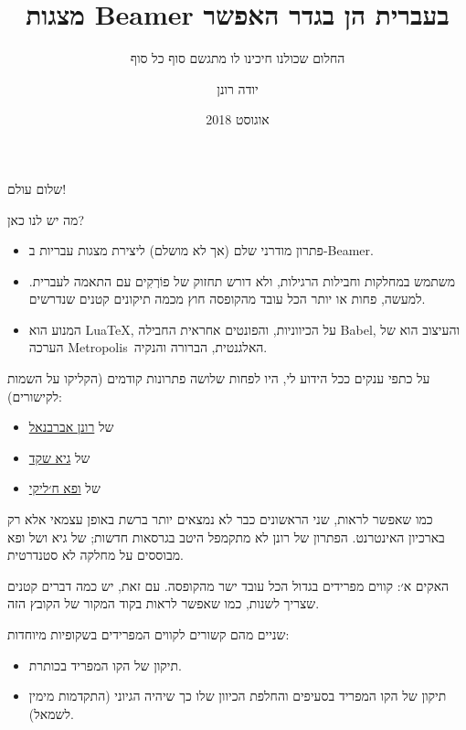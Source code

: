 \documentclass{beamer}
\author{
	\texorpdfstring{
		יודה רונן
		\quad \smallurl{<https://me.digitalwords.net/>}}{Yuda Ronen}}
\begin{document}
	\title{מצגות Beamer בעברית הן בגדר האפשר}
	\subtitle{החלום שכולנו חיכינו לו מתגשם סוף כל סוף}
	
	\date{אוגוסט 2018}
	\frame{\titlepage}
	
	\begin{frame}{שלום עולם!}
		
		מה יש לנו כאן?
		
		\begin{itemize}
			\item פתרון מודרני שלם (אך לא מושלם) ליצירת מצגות עבריות ב-Beamer.
			\item משתמש במחלקות וחבילות הרגילות, ולא דורש תחזוק של פוֹרְקִים עם התאמה לעברית. למעשה, פחות או יותר הכל עובד מהקופסה חוץ מכמה תיקונים קטנים שנדרשים.
			\item המנוע הוא Lua\TeX\/, על הכיווניות, והפונטים אחראית החבילה Babel, והעיצוב הוא של הערכה Metropolis האלגנטית, הברורה והנקיה.
		\end{itemize}
	\end{frame}
	
	
	\begin{frame}{על כתפי ענקים}
		ככל הידוע לי, היו לפחות שלושה פתרונות קודמים (הקליקו על השמות לקישורים):
		\begin{itemize}
			\item של \href{https://web.archive.org/web/20111206041733/http://www.technion.ac.il/~ronen/latex/beamer_hebrew.html}{רונן אברבנאל}
			\item של \href{https://web.archive.org/web/20150327024158/http://technion.ac.il/~gai/beamer/index.html}{גיא שקד}
			\item של \href{https://tug.org/pipermail/xetex/2009-July/013721.html}{ופא ח׳ליקי}
		\end{itemize}
		
		כמו שאפשר לראות, שני הראשונים כבר לא נמצאים יותר ברשת באופן עצמאי אלא רק בארכיון האינטרנט.
		הפתרון של רונן לא מתקמפל היטב בגרסאות חדשות;
		של גיא ושל ופא מבוססים על מחלקה לא סטנדרטית.
	\end{frame}
	
	
	\begin{frame}{האקים א׳: קווים מפרידים}
		בגדול הכל עובד ישר מהקופסה. עם זאת, יש כמה דברים קטנים שצריך לשנות, כמו שאפשר לראות בקוד המקור של הקובץ הזה.
		
		שניים מהם קשורים לקווים המפרידים בשקופיות מיוחדות:
		
		\begin{itemize}
			\item תיקון של הקו המפריד בכותרת.
			\item תיקון של הקו המפריד בסעיפים והחלפת הכיוון שלו כך שיהיה הגיוני (התקדמות מימין לשמאל).
		\end{itemize}
	\end{frame}
	
\end{document}
